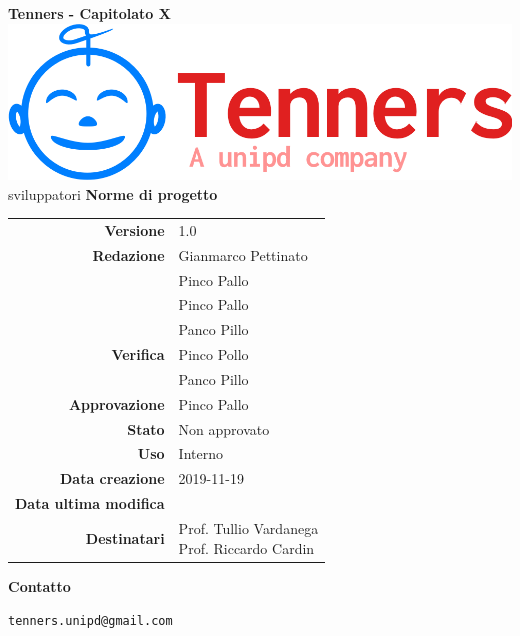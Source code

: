 \begin{titlepage}
	\begin{center}
		\large \textbf{Tenners - Capitolato X}
		\vfill
		\includegraphics[scale = 0.3]{./res/img/logo.png}\\
sviluppatori		\vfill
		\Huge \textbf{Norme di progetto}

        \vfill
        \large

        \begin{tabular}{r|l}
                        \textbf{Versione} & 1.0 \\
                        \textbf{Redazione} &
                        Gianmarco Pettinato\\&
                        Pinco Pallo \\&
                        Pinco Pallo \\&
                        Panco Pillo \\
                        \textbf{Verifica} &
                        Pinco Pollo \\&
                        Panco Pillo \\
                        \textbf{Approvazione} & Pinco Pallo \\
                        \textbf{Stato} & Non approvato \\
                        \textbf{Uso} &  Interno\\
                        \textbf{Data creazione} &  2019-11-19\\
                        \textbf{Data ultima modifica} &  \\
                        \textbf{Destinatari} & \parbox[t]{5cm}{Prof. Tullio Vardanega\\Prof. Riccardo Cardin}
                \end{tabular}
                \vfill
                \normalsize
                \vfill
                \textbf{Contatto}

                \texttt{tenners.unipd@gmail.com}

	\end{center}
\end{titlepage}
